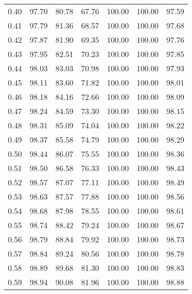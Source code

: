 \begin{tabular}{|c|c|c|c|c|c|c|}
      0.40 &     97.70 &     80.78 &      67.76 &  100.00 &     100.00 &         97.59 \\
      0.41 &     97.79 &     81.36 &      68.57 &  100.00 &     100.00 &         97.68 \\
      0.42 &     97.87 &     81.90 &      69.35 &  100.00 &     100.00 &         97.76 \\
      0.43 &     97.95 &     82.51 &      70.23 &  100.00 &     100.00 &         97.85 \\
      0.44 &     98.03 &     83.03 &      70.98 &  100.00 &     100.00 &         97.93 \\
      0.45 &     98.11 &     83.60 &      71.82 &  100.00 &     100.00 &         98.01 \\
      0.46 &     98.18 &     84.16 &      72.66 &  100.00 &     100.00 &         98.09 \\
      0.47 &     98.24 &     84.59 &      73.30 &  100.00 &     100.00 &         98.15 \\
      0.48 &     98.31 &     85.09 &      74.04 &  100.00 &     100.00 &         98.22 \\
      0.49 &     98.37 &     85.58 &      74.79 &  100.00 &     100.00 &         98.29 \\
      0.50 &     98.44 &     86.07 &      75.55 &  100.00 &     100.00 &         98.36 \\
      0.51 &     98.50 &     86.58 &      76.33 &  100.00 &     100.00 &         98.43 \\
      0.52 &     98.57 &     87.07 &      77.11 &  100.00 &     100.00 &         98.49 \\
      0.53 &     98.63 &     87.57 &      77.88 &  100.00 &     100.00 &         98.56 \\
      0.54 &     98.68 &     87.98 &      78.55 &  100.00 &     100.00 &         98.61 \\
      0.55 &     98.74 &     88.42 &      79.24 &  100.00 &     100.00 &         98.67 \\
      0.56 &     98.79 &     88.84 &      79.92 &  100.00 &     100.00 &         98.73 \\
      0.57 &     98.84 &     89.24 &      80.56 &  100.00 &     100.00 &         98.78 \\
      0.58 &     98.89 &     89.68 &      81.30 &  100.00 &     100.00 &         98.83 \\
      0.59 &     98.94 &     90.08 &      81.96 &  100.00 &     100.00 &         98.88 \\

\end{tabular}
